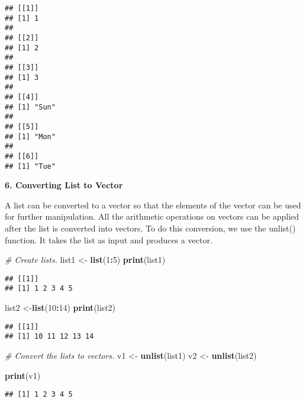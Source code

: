 \documentclass[
]{article}
\newenvironment{Shaded}{\begin{snugshade}}{\end{snugshade}}
\newcommand{\CommentTok}[1]{\textcolor[rgb]{0.56,0.35,0.01}{\textit{#1}}}
\newcommand{\DecValTok}[1]{\textcolor[rgb]{0.00,0.00,0.81}{#1}}
\newcommand{\FunctionTok}[1]{\textcolor[rgb]{0.13,0.29,0.53}{\textbf{#1}}}
\newcommand{\NormalTok}[1]{#1}
\newcommand{\OtherTok}[1]{\textcolor[rgb]{0.56,0.35,0.01}{#1}}
\newcommand{\SpecialCharTok}[1]{\textcolor[rgb]{0.81,0.36,0.00}{\textbf{#1}}}
\begin{document}
\begin{verbatim}
## [[1]]
## [1] 1
## 
## [[2]]
## [1] 2
## 
## [[3]]
## [1] 3
## 
## [[4]]
## [1] "Sun"
## 
## [[5]]
## [1] "Mon"
## 
## [[6]]
## [1] "Tue"
\end{verbatim}

\textbf{6. Converting List to Vector}

A list can be converted to a vector so that the elements of the vector
can be used for further manipulation. All the arithmetic operations on
vectors can be applied after the list is converted into vectors. To do
this conversion, we use the unlist() function. It takes the list as
input and produces a vector.

\begin{Shaded}
\begin{Highlighting}[]
\CommentTok{\# Create lists.}
\NormalTok{list1 }\OtherTok{\textless{}{-}} \FunctionTok{list}\NormalTok{(}\DecValTok{1}\SpecialCharTok{:}\DecValTok{5}\NormalTok{)}
\FunctionTok{print}\NormalTok{(list1)}
\end{Highlighting}
\end{Shaded}

\begin{verbatim}
## [[1]]
## [1] 1 2 3 4 5
\end{verbatim}

\begin{Shaded}
\begin{Highlighting}[]
\NormalTok{list2 }\OtherTok{\textless{}{-}}\FunctionTok{list}\NormalTok{(}\DecValTok{10}\SpecialCharTok{:}\DecValTok{14}\NormalTok{)}
\FunctionTok{print}\NormalTok{(list2)}
\end{Highlighting}
\end{Shaded}

\begin{verbatim}
## [[1]]
## [1] 10 11 12 13 14
\end{verbatim}

\begin{Shaded}
\begin{Highlighting}[]
\CommentTok{\# Convert the lists to vectors.}
\NormalTok{v1 }\OtherTok{\textless{}{-}} \FunctionTok{unlist}\NormalTok{(list1)}
\NormalTok{v2 }\OtherTok{\textless{}{-}} \FunctionTok{unlist}\NormalTok{(list2)}

\FunctionTok{print}\NormalTok{(v1)}
\end{Highlighting}
\end{Shaded}

\begin{verbatim}
## [1] 1 2 3 4 5
\end{verbatim}
\end{document}
